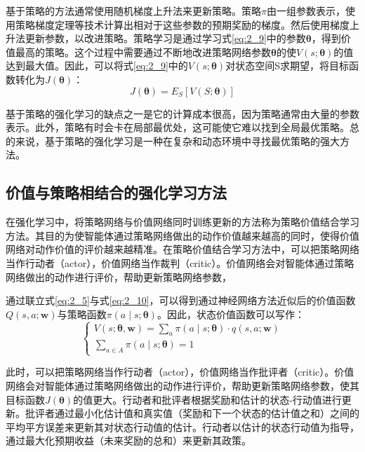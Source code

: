 基于策略的方法通常使用随机梯度上升法来更新策略。策略$\pi$由一组参数表示，使用策略梯度定理等技术计算出相对于这些参数的预期奖励的梯度。然后使用梯度上升法更新参数，以改进策略。策略学习是通过学习式\ref{eq:2_9}中的参数$\boldsymbol{\theta}$，得到价值最高的策略。这个过程中需要通过不断地改进策略网络参数$\boldsymbol{\theta}$的使$V(s;\boldsymbol{\theta})$的值达到最大值。因此，可以将式\ref{eq:2_9}中的$V(s;\boldsymbol{\theta})$对状态空间S求期望，将目标函数转化为$J(\boldsymbol{\theta})$：
\begin{equation}	
\label{eq:2_11}
J(\boldsymbol{\theta})=E_S[V(S;\boldsymbol{\theta})]
\end{equation}

基于策略的强化学习的缺点之一是它的计算成本很高，因为策略通常由大量的参数表示。此外，策略有时会卡在局部最优处，这可能使它难以找到全局最优策略。总的来说，基于策略的强化学习是一种在复杂和动态环境中寻找最优策略的强大方法。

\subsection{价值与策略相结合的强化学习方法}

在强化学习中，将策略网络与价值网络同时训练更新的方法称为策略价值结合学习方法。其目的为使智能体通过策略网络做出的动作价值越来越高的同时，使得价值网络对动作价值的评价越来越精准。在策略价值结合学习方法中，可以把策略网络当作行动者（actor），价值网络当作裁判（critic）。价值网络会对智能体通过策略网络做出的动作进行评价，帮助更新策略网络参数，

通过联立式\ref{eq:2_5}与式\ref{eq:2_10}，可以得到通过神经网络方法近似后的价值函数$Q(s,a;\boldsymbol{w})$与策略函数$\pi(a\mid s;\boldsymbol{\theta})$。因此，状态价值函数可以写作：
\begin{equation}
\label{eq:2_12}
\left\{\begin{array}{c}
V(s ; \boldsymbol{\theta}, \boldsymbol{w})=\sum_a \pi(a \mid s ; \boldsymbol{\theta}) \cdot q(s, a ; \boldsymbol{w}) \\
\sum_{a \in A} \pi(a \mid s ; \boldsymbol{\theta})=1
\end{array}\right.
\end{equation}

此时，可以把策略网络当作行动者（actor），价值网络当作批评者（critic）。价值网络会对智能体通过策略网络做出的动作进行评价，帮助更新策略网络参数，使其目标函数$J(\boldsymbol{\theta})$的值更大。行动者和批评者根据奖励和估计的状态-行动值进行更新。批评者通过最小化估计值和真实值（奖励和下一个状态的估计值之和）之间的平均平方误差来更新其对状态行动值的估计。行动者以估计的状态行动值为指导，通过最大化预期收益（未来奖励的总和）来更新其政策。


